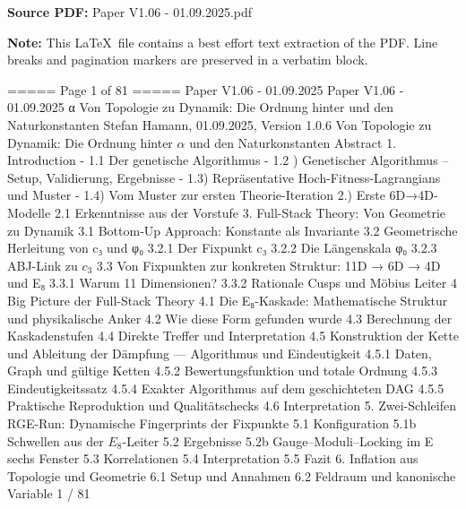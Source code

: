 
\maketitle
\noindent\textbf{Source PDF:} Paper V1.06 - 01.09.2025.pdf

\bigskip
\noindent\textbf{Note:} This \LaTeX\ file contains a best effort text extraction of the PDF.
Line breaks and pagination markers are preserved in a verbatim block.

\bigskip
\begin{MyVerbatim}
===== Page 1 of 81 =====
Paper V1.06 - 01.09.2025
Paper V1.06 - 01.09.2025
α
Von Topologie zu Dynamik: Die Ordnung hinter und den
Naturkonstanten
Stefan Hamann, 01.09.2025, Version 1.0.6
Von Topologie zu Dynamik: Die Ordnung hinter $\alpha$ und den Naturkonstanten
Abstract
1. Introduction
- 1.1 Der genetische Algorithmus
- 1.2 ) Genetischer Algorithmus – Setup, Validierung, Ergebnisse
- 1.3) Repräsentative Hoch-Fitness-Lagrangians und Muster
- 1.4) Vom Muster zur ersten Theorie-Iteration
2.) Erste 6D→4D-Modelle
2.1 Erkenntnisse aus der Vorstufe
3. Full-Stack Theory: Von Geometrie zu Dynamik
3.1 Bottom-Up Approach: Konstante als Invariante
3.2 Geometrische Herleitung von c₃ und φ₀
3.2.1 Der Fixpunkt c₃
3.2.2 Die Längenskala φ₀
3.2.3 ABJ-Link zu $c_3$
3.3 Von Fixpunkten zur konkreten Struktur: 11D → 6D → 4D und E₈
3.3.1 Warum 11 Dimensionen?
3.3.2 Rationale Cusps und Möbius Leiter
4 Big Picture der Full-Stack Theory
4.1 Die E₈-Kaskade: Mathematische Struktur und physikalische Anker
4.2 Wie diese Form gefunden wurde
4.3 Berechnung der Kaskadenstufen
4.4 Direkte Treffer und Interpretation
4.5 Konstruktion der Kette und Ableitung der Dämpfung — Algorithmus und Eindeutigkeit
4.5.1 Daten, Graph und gültige Ketten
4.5.2 Bewertungsfunktion und totale Ordnung
4.5.3 Eindeutigkeitssatz
4.5.4 Exakter Algorithmus auf dem geschichteten DAG
4.5.5 Praktische Reproduktion und Qualitätschecks
4.6 Interpretation
5. Zwei-Schleifen RGE-Run: Dynamische Fingerprints der Fixpunkte
5.1 Konfiguration
5.1b Schwellen aus der $E_{8}$-Leiter
5.2 Ergebnisse
5.2b Gauge–Moduli–Locking im E sechs Fenster
5.3 Korrelationen
5.4 Interpretation
5.5 Fazit
6. Inflation aus Topologie und Geometrie
6.1 Setup und Annahmen
6.2 Feldraum und kanonische Variable
1 / 81


\end{MyVerbatim}
